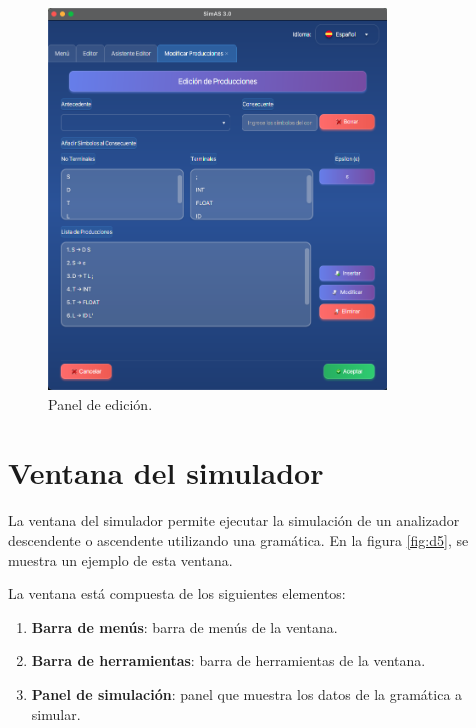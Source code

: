 \begin{figure}[htp]
\centering
	\includegraphics[width=0.8\textwidth]{figuras2/editor/panel_producciones.png}
	\caption{Panel de edición.}
	\label{fig:d4}
\end{figure}

\section{Ventana del simulador}

La ventana del simulador permite ejecutar la simulación de un analizador descendente o ascendente utilizando una gramática. En la figura \ref{fig:d5}, se muestra un ejemplo de esta ventana.

La ventana está compuesta de los siguientes elementos:
\begin{enumerate}
 \item \textbf{Barra de menús}: barra de menús de la ventana.
 \item \textbf{Barra de herramientas}: barra de herramientas de la ventana.
 \item \textbf{Panel de simulación}: panel que muestra los datos de la gramática a simular.
\end{enumerate}

